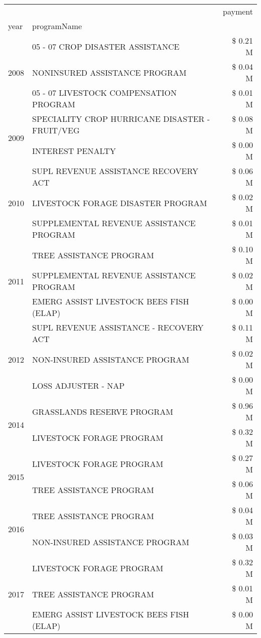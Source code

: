 \begin{tabular}{llr}
\toprule
 &  & payment \\
year & programName &  \\
\midrule
\multirow[t]{3}{*}{2008} & 05 - 07 CROP DISASTER ASSISTANCE & \$ 0.21 M \\
 & NONINSURED ASSISTANCE PROGRAM & \$ 0.04 M \\
 & 05 - 07 LIVESTOCK COMPENSATION PROGRAM & \$ 0.01 M \\
\cline{1-3}
\multirow[t]{2}{*}{2009} & SPECIALITY CROP HURRICANE DISASTER - FRUIT/VEG & \$ 0.08 M \\
 & INTEREST PENALTY & \$ 0.00 M \\
\cline{1-3}
\multirow[t]{3}{*}{2010} & SUPL REVENUE ASSISTANCE RECOVERY ACT & \$ 0.06 M \\
 & LIVESTOCK FORAGE DISASTER  PROGRAM & \$ 0.02 M \\
 & SUPPLEMENTAL REVENUE ASSISTANCE PROGRAM & \$ 0.01 M \\
\cline{1-3}
\multirow[t]{3}{*}{2011} & TREE ASSISTANCE PROGRAM & \$ 0.10 M \\
 & SUPPLEMENTAL REVENUE ASSISTANCE PROGRAM & \$ 0.02 M \\
 & EMERG ASSIST LIVESTOCK BEES FISH (ELAP) & \$ 0.00 M \\
\cline{1-3}
\multirow[t]{3}{*}{2012} & SUPL REVENUE ASSISTANCE - RECOVERY ACT & \$ 0.11 M \\
 & NON-INSURED ASSISTANCE PROGRAM & \$ 0.02 M \\
 & LOSS ADJUSTER - NAP & \$ 0.00 M \\
\cline{1-3}
\multirow[t]{2}{*}{2014} & GRASSLANDS RESERVE PROGRAM & \$ 0.96 M \\
 & LIVESTOCK FORAGE PROGRAM & \$ 0.32 M \\
\cline{1-3}
\multirow[t]{2}{*}{2015} & LIVESTOCK FORAGE PROGRAM & \$ 0.27 M \\
 & TREE ASSISTANCE PROGRAM & \$ 0.06 M \\
\cline{1-3}
\multirow[t]{2}{*}{2016} & TREE ASSISTANCE PROGRAM                       & \$ 0.04 M \\
 & NON-INSURED ASSISTANCE PROGRAM                & \$ 0.03 M \\
\cline{1-3}
\multirow[t]{3}{*}{2017} & LIVESTOCK FORAGE PROGRAM & \$ 0.32 M \\
 & TREE ASSISTANCE PROGRAM & \$ 0.01 M \\
 & EMERG ASSIST LIVESTOCK BEES FISH (ELAP) & \$ 0.00 M \\

\end{tabular}
